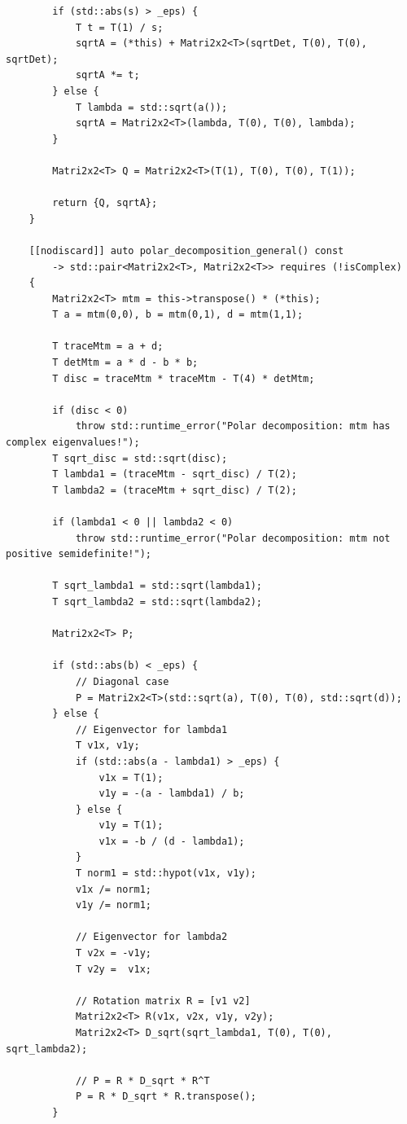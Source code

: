 \documentclass[11pt]{article}
\begin{document}
\begin{lstlisting}
        if (std::abs(s) > _eps) {
            T t = T(1) / s;
            sqrtA = (*this) + Matri2x2<T>(sqrtDet, T(0), T(0), sqrtDet);
            sqrtA *= t;
        } else {
            T lambda = std::sqrt(a());
            sqrtA = Matri2x2<T>(lambda, T(0), T(0), lambda);
        }
        
        Matri2x2<T> Q = Matri2x2<T>(T(1), T(0), T(0), T(1));
        
        return {Q, sqrtA};
    }

    [[nodiscard]] auto polar_decomposition_general() const
        -> std::pair<Matri2x2<T>, Matri2x2<T>> requires (!isComplex)
    {
        Matri2x2<T> mtm = this->transpose() * (*this);
        T a = mtm(0,0), b = mtm(0,1), d = mtm(1,1);

        T traceMtm = a + d;
        T detMtm = a * d - b * b;
        T disc = traceMtm * traceMtm - T(4) * detMtm;

        if (disc < 0)
            throw std::runtime_error("Polar decomposition: mtm has complex eigenvalues!");
        T sqrt_disc = std::sqrt(disc);
        T lambda1 = (traceMtm - sqrt_disc) / T(2);
        T lambda2 = (traceMtm + sqrt_disc) / T(2);

        if (lambda1 < 0 || lambda2 < 0)
            throw std::runtime_error("Polar decomposition: mtm not positive semidefinite!");

        T sqrt_lambda1 = std::sqrt(lambda1);
        T sqrt_lambda2 = std::sqrt(lambda2);

        Matri2x2<T> P;

        if (std::abs(b) < _eps) {
            // Diagonal case
            P = Matri2x2<T>(std::sqrt(a), T(0), T(0), std::sqrt(d));
        } else {
            // Eigenvector for lambda1
            T v1x, v1y;
            if (std::abs(a - lambda1) > _eps) {
                v1x = T(1);
                v1y = -(a - lambda1) / b;
            } else {
                v1y = T(1);
                v1x = -b / (d - lambda1);
            }
            T norm1 = std::hypot(v1x, v1y);
            v1x /= norm1;
            v1y /= norm1;

            // Eigenvector for lambda2
            T v2x = -v1y;
            T v2y =  v1x;

            // Rotation matrix R = [v1 v2]
            Matri2x2<T> R(v1x, v2x, v1y, v2y);
            Matri2x2<T> D_sqrt(sqrt_lambda1, T(0), T(0), sqrt_lambda2);

            // P = R * D_sqrt * R^T
            P = R * D_sqrt * R.transpose();
        }


\end{lstlisting}
\end{document}
